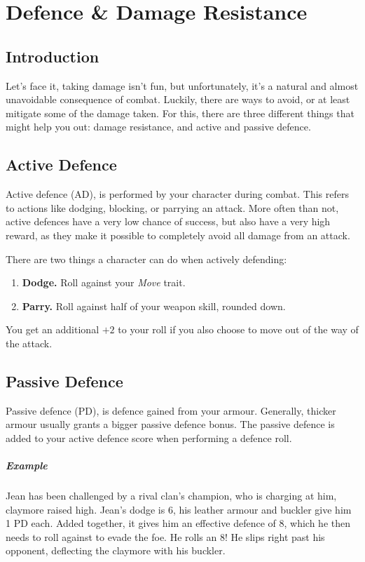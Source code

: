 \chapter{Defence \& Damage Resistance}\label{chap:defence}
\section{Introduction}
Let's face it, taking damage isn't fun, but unfortunately, it's a natural and almost unavoidable consequence of combat.
Luckily, there are ways to avoid, or at least mitigate some of the damage taken.
For this, there are three different things that might help you out: damage resistance, and active and passive defence.

\section{Active Defence}
Active defence (AD), is performed by your character during combat.
This refers to actions like dodging, blocking, or parrying an attack.
More often than not, active defences have a very low chance of success, but also have a very high reward, as they make it possible to completely avoid all damage from an attack.

There are two things a character can do when actively defending:
\begin{enumerate}
    \item \textbf{Dodge.} Roll against your \textit{Move} trait.
    \item \textbf{Parry.} Roll against half of your weapon skill, rounded down.
\end{enumerate}
You get an additional $+2$ to your roll if you also choose to move out of the way of the attack.

\section{Passive Defence}
Passive defence (PD), is defence gained from your armour.
Generally, thicker armour usually grants a bigger passive defence bonus.
The passive defence is added to your active defence score when performing a defence roll.

\paragraph{Example} Jean has been challenged by a rival clan's champion, who is charging at him, claymore raised high.
Jean's dodge is 6, his leather armour and buckler give him 1 PD each.
Added together, it gives him an effective defence of 8, which he then needs to roll against to evade the foe.
He rolls an 8! He slips right past his opponent, deflecting the claymore with his buckler.

